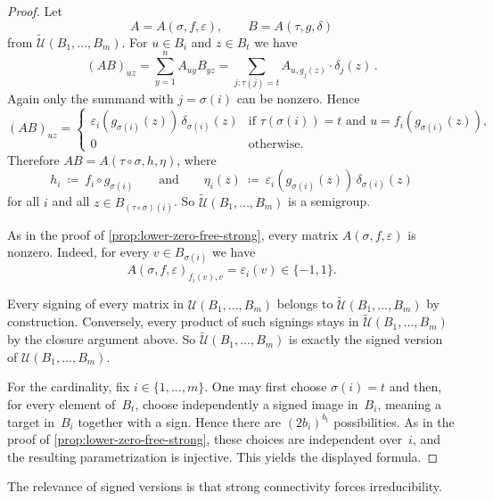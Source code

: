 \documentclass{lmcs}
\theoremstyle{definition}
\newcommand{\U}{\mathcal{U}}
\begin{document}
\begin{proof}
Let
\[
  A = A(\sigma,f,\varepsilon), \qquad B = A(\tau,g,\delta)
\]
from $\widetilde{\U}(B_1,\ldots,B_m)$. For $u \in B_i$ and $z \in B_t$ we have
\[
  (A B)_{u z}
  =
  \sum_{y=1}^n A_{u y} B_{y z}
  =
  \sum_{j : \tau(j)=t} A_{u, g_j(z)} \cdot \delta_j(z)\,.
\]
Again only the summand with $j = \sigma(i)$ can be nonzero. Hence
\[
  (A B)_{u z}
  =
  \begin{cases}
    \varepsilon_i(g_{\sigma(i)}(z)) \, \delta_{\sigma(i)}(z)
    &\text{if } \tau(\sigma(i)) = t \text{ and } u = f_i(g_{\sigma(i)}(z)),\\
    0 &\text{otherwise.}
  \end{cases}
\]
Therefore $A B = A(\tau \circ \sigma,h,\eta)$, where
\[
  h_i \ \coloneqq \ f_i \circ g_{\sigma(i)}
  \qquad\text{and}\qquad
  \eta_i(z) \ \coloneqq \ \varepsilon_i(g_{\sigma(i)}(z))\, \delta_{\sigma(i)}(z)
\]
for all $i$ and all $z \in B_{(\tau \circ \sigma)(i)}$. So $\widetilde{\U}(B_1,\ldots,B_m)$ is a semigroup.

As in the proof of \cref{prop:lower-zero-free-strong}, every matrix $A(\sigma,f,\varepsilon)$ is nonzero. Indeed, for every $v \in B_{\sigma(i)}$ we have
\[
  A(\sigma,f,\varepsilon)_{f_i(v),v} = \varepsilon_i(v) \in \{-1,1\}.
\]

Every signing of every matrix in $\U(B_1,\ldots,B_m)$ belongs to $\widetilde{\U}(B_1,\ldots,B_m)$ by construction. Conversely, every product of such signings stays in $\widetilde{\U}(B_1,\ldots,B_m)$ by the closure argument above. So $\widetilde{\U}(B_1,\ldots,B_m)$ is exactly the signed version of $\U(B_1,\ldots,B_m)$.

For the cardinality, fix $i \in \{1,\ldots,m\}$. One may first choose $\sigma(i)=t$ and then, for every element of~$B_t$, choose independently a signed image in~$B_i$, meaning a target in~$B_i$ together with a sign. Hence there are $(2 b_i)^{b_t}$ possibilities. As in the proof of \cref{prop:lower-zero-free-strong}, these choices are independent over~$i$, and the resulting parametrization is injective. This yields the displayed formula.
\end{proof}

The relevance of signed versions is that strong connectivity forces irreducibility.
\end{document}

